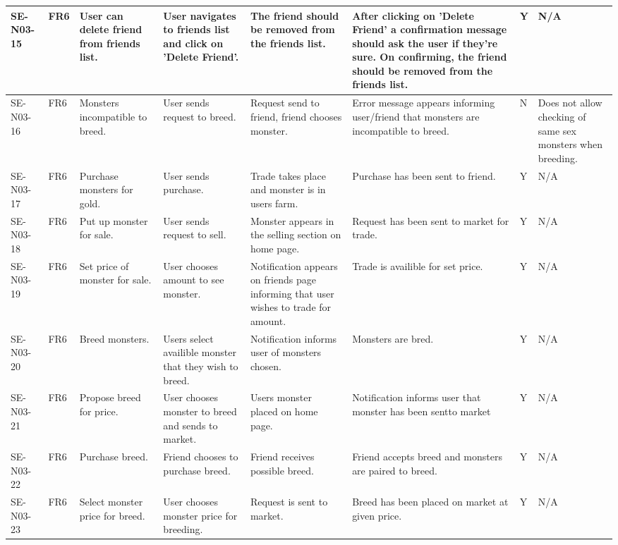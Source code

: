 \documentclass[a4paper]{article}
\begin{document}
\begin{landscape}
\begin{center}
\begin{tabular}{| l | l | p{3cm} | p{3cm} | p{4cm} | p{4cm} |p{1cm} |p{3cm} |}
\end{tabular}
\end{center}

\clearpage

\begin{center}
\thispagestyle{empty}
	\begin{tabular}{| l | l | p{3cm} | p{3cm} | p{4cm} | p{4cm} |p{1cm} |p{3cm} |}
\hline
	SE-N03-15 & FR6 & User can delete friend from friends list. & User navigates to friends list and click on 'Delete Friend'. & The friend should be removed from the friends list. & After clicking on 'Delete Friend' a confirmation message should ask the user if they're sure. On confirming, the friend should be removed from the friends list.& Y & N/A\\
\hline
          SE-N03-16 & FR6 & Monsters incompatible to breed. & User sends request to breed. & Request send to friend, friend chooses monster. & Error message appears informing user/friend that monsters are incompatible to breed. & N & Does not allow checking of same sex monsters when breeding.\\
\hline
	SE-N03-17 & FR6 & Purchase monsters for gold. & User sends purchase. & Trade takes place and monster is in users farm. &  Purchase has been sent to friend. & Y & N/A \\
\hline
	SE-N03-18 & FR6 & Put up monster for sale. & User sends request to sell. & Monster appears in the selling section on home page. &  Request has been sent to market for trade. & Y & N/A \\
\hline
	SE-N03-19 & FR6 & Set price of monster for sale. & User chooses amount to see monster. & Notification appears on friends page informing that user wishes to trade for amount. & Trade is availible for set price. & Y & N/A \\
	\hline
	SE-N03-20 & FR6 & Breed monsters. & Users select availible monster that they wish to breed. & Notification informs user of monsters chosen. & Monsters are bred. & Y & N/A \\
	\hline
	SE-N03-21 & FR6 & Propose breed for price. & User chooses monster to breed and sends to market. &Users monster placed on home page. & Notification informs user that monster has been sentto market & Y & N/A \\
\hline
	SE-N03-22 & FR6 & Purchase breed. & Friend chooses to purchase breed. & Friend receives possible breed. & Friend accepts breed and monsters are paired to breed. & Y & N/A \\
\hline
	SE-N03-23 & FR6 & Select monster price for breed. & User chooses monster price for breeding. & Request is sent to market. & Breed has been placed on market at given price. & Y & N/A \\

\end{tabular}
\end{center}
\end{landscape}
\end{document}
